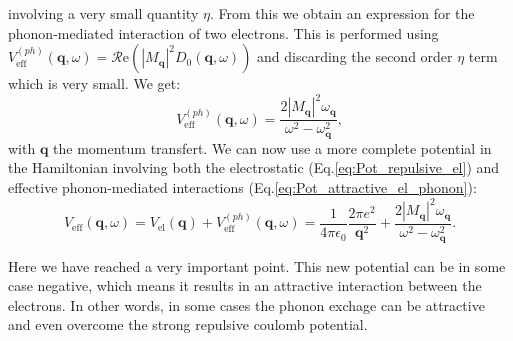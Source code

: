 \documentclass[../main.tex]{subfile}
\begin{document}
involving a very small quantity $\eta$. From this we obtain an expression for the phonon-mediated interaction of two electrons.
This is performed using $V^{(ph)}_{\text{eff}}(\bm{q},\omega) = \mathcal{R}\text{e}\left({|M_{\bm{q}}|^2 D_0(\bm{q},\omega)}\right)$ and discarding the second 
order $\eta$ term which is very small. We get:
\begin{equation}\label{eq:Pot_attractive_el_phonon}
    V^{(ph)}_{\text{eff}}(\bm{q},\omega) = \frac{2|M_{\bm{q}}|^2\omega_{\bm{q}}}{\omega^2 - \omega_{\bm{q}}^2},
\end{equation}
with $\bm{q}$ the momentum transfert. 
We can now use a more complete potential in the Hamiltonian involving both the electrostatic (Eq.\ref{eq:Pot_repulsive_el}) and effective
phonon-mediated interactions (Eq.\ref{eq:Pot_attractive_el_phonon}):
\begin{equation}\label{eq:V_eff_phonon}
    V_{\text{eff}}(\bm{q}, \omega) =  V_{\text{el}}(\bm{q}) + V^{(ph)}_{\text{eff}}(\bm{q},\omega)
     = \frac{1}{4\pi\epsilon_0} \frac{2\pi e^2}{\bm{q}^2} + \frac{2|M_{\bm{q}}|^2\omega_{\bm{q}}}{\omega^2 - \omega_{\bm{q}}^2}.
\end{equation}

Here we have reached a very important point. This new potential can be in some case negative, which means it results in an attractive interaction between the electrons. 
In other words, in some cases the phonon exchage can be attractive and even overcome the strong repulsive coulomb potential.
\end{document}
